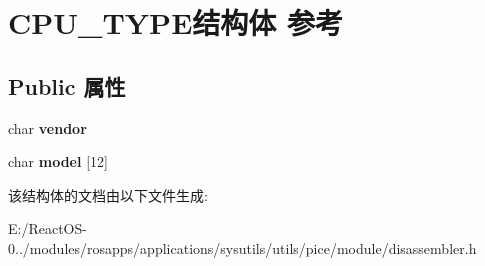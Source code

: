 \hypertarget{struct_c_p_u___t_y_p_e}{}\section{C\+P\+U\+\_\+\+T\+Y\+P\+E结构体 参考}
\label{struct_c_p_u___t_y_p_e}
\subsection*{Public 属性}
\begin{DoxyCompactItemize}
\item 
\mbox{\label{struct_c_p_u___t_y_p_e_a6042ef6117374ed706e65e998da9954b}} 
char {\bfseries vendor}
\item 
\mbox{\label{struct_c_p_u___t_y_p_e_a7bed9aed97840de2b3d05638ccde2cd8}} 
char {\bfseries model} \mbox{[}12\mbox{]}
\end{DoxyCompactItemize}


该结构体的文档由以下文件生成\+:\begin{DoxyCompactItemize}
\item 
E\+:/\+React\+O\+S-\/0../modules/rosapps/applications/sysutils/utils/pice/module/disassembler.\+h\end{DoxyCompactItemize}
